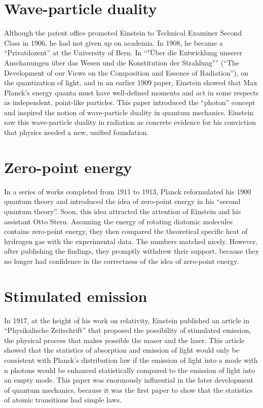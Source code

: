 \documentclass[twoside]{memoir}
\begin{document}
\section{Wave-particle duality}
Although the patent office promoted Einstein to Technical Examiner Second Class in 1906, he had not given up on academia. In 1908, he became a \enquote{Privatdozent} at the University of Bern. In \enquote{"Über die Entwicklung unserer Anschauungen über das Wesen und die Konstitution der Strahlung"} (\enquote{The Development of our Views on the Composition and Essence of Radiation}), on the quantization of light, and in an earlier 1909 paper, Einstein showed that Max Planck's energy quanta must have well-defined momenta and act in some respects as independent, point-like particles. This paper introduced the \enquote{photon} concept and inspired the notion of wave-particle duality in quantum mechanics. Einstein saw this wave-particle duality in radiation as concrete evidence for his conviction that physics needed a new, unified foundation.
\section{Zero-point energy}
In a series of works completed from 1911 to 1913, Planck reformulated his 1900 quantum theory and introduced the idea of zero-point energy in his \enquote{second quantum theory}. Soon, this idea attracted the attention of Einstein and his assistant Otto Stern. Assuming the energy of rotating diatomic molecules contains zero-point energy, they then compared the theoretical specific heat of hydrogen gas with the experimental data. The numbers matched nicely. However, after publishing the findings, they promptly withdrew their support, because they no longer had confidence in the correctness of the idea of zero-point energy.
\section{Stimulated emission}
In 1917, at the height of his work on relativity, Einstein published an article in \enquote{Physikalische Zeitschrift} that proposed the possibility of stimulated emission, the physical process that makes possible the maser and the laser.
This article showed that the statistics of absorption and emission of light would only be consistent with Planck's distribution law if the emission of light into a mode with n photons would be enhanced statistically compared to the emission of light into an empty mode. This paper was enormously influential in the later development of quantum mechanics, because it was the first paper to show that the statistics of atomic transitions had simple laws.
\end{document}
